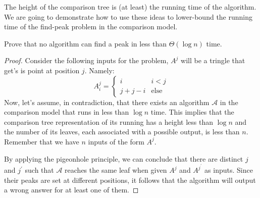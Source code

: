 The height of the comparison tree is (at least) the running time of the algorithm. We are going to demonstrate how to use these ideas to lower-bound the running time of the find-peak problem in the comparison model.


\begin{example}
  Prove that no algorithm can find a peak in less than $\Theta\left( \log n \right)$ time.
\end{example}
\begin{proof}
  Consider the following inputs for the problem, $A^{j}$ will be a tringle that get's is point at position $j$. Namely:  
  \begin{equation*}
      A^{j}_{i} = \begin{cases}
        i & i < j \\
         j + j - i & \text{else}
      \end{cases}
  \end{equation*} 
  Now, let's assume, in contradiction, that there exists an algorithm $\mathcal{A}$ in the comparison model that runs in less than $\log n$ time. This implies that the comparison tree representation of its running has a height less than $\log n$ and the number of its leaves, each associated with a possible output, is less than $n$. Remember that we have $n$ inputs of the form $A^{j}$. 

  By applying the pigeonhole principle, we can conclude that there are distinct $j$ and $j^{\prime}$ such that $\mathcal{A}$ reaches the same leaf when given $A^{j}$ and $A^{j^{\prime}}$ as inputs. Since their peaks are set at different positions, it follows that the algorithm will output a wrong answer for at least one of them.
\end{proof}



